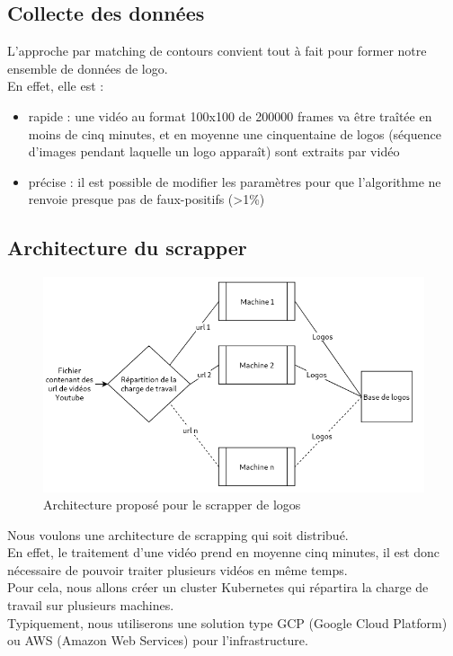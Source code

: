 \documentclass[11pt]{article}
\begin{document}
\subsection{Collecte des données}
\label{sec:org402ca01}
L'approche par matching de contours convient tout à fait pour former notre ensemble de données de logo.\\

En effet, elle est :\\
\begin{itemize}
\item rapide : une vidéo au format 100x100 de 200000 frames va être traîtée en moins de cinq minutes, et en moyenne une cinquentaine de logos (séquence d'images pendant laquelle un logo apparaît) sont extraits par vidéo\\
\item précise : il est possible de modifier les paramètres pour que l'algorithme ne renvoie presque pas de faux-positifs (>1\%)\\
\end{itemize}

\subsection{Architecture du scrapper}
\label{sec:org69a66cd}
\begin{figure}[htbp]
\centering
\includegraphics[width=15cm]{arch_scrap.png}
\caption{Architecture proposé pour le scrapper de logos}
\end{figure}
Nous voulons une architecture de scrapping qui soit distribué.\\
En effet, le traitement d'une vidéo prend en moyenne cinq minutes, il est donc nécessaire de pouvoir traiter plusieurs vidéos en même temps.\\
Pour cela, nous allons créer un cluster Kubernetes qui répartira la charge de travail sur plusieurs machines.\\
Typiquement, nous utiliserons une solution type GCP (Google Cloud Platform) ou AWS (Amazon Web Services) pour l'infrastructure.\\
\end{document}
